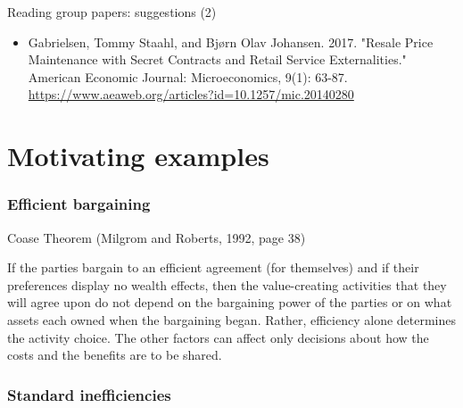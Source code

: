 \documentclass[11pt,english]{beamer}
\begin{document}
\begin{frame}{Reading group papers: suggestions (2)}
  \begin{itemize}

  \item Gabrielsen, Tommy Staahl, and Bjørn Olav Johansen. 2017. "Resale Price Maintenance with Secret Contracts and Retail Service Externalities." American Economic Journal: Microeconomics, 9(1): 63-87. \url{https://www.aeaweb.org/articles?id=10.1257/mic.20140280}  
    
  \end{itemize}
\end{frame}

\part[lecture 1]{Motivating examples}

\section{Efficient bargaining}

\begin{frame}{Coase Theorem (Milgrom and Roberts,
    1992, page 38)}

If the parties bargain to an efficient agreement
(for themselves) and if their preferences display
no wealth effects, then the value-creating activities
that they will agree upon do not depend on the
bargaining power of the parties or on what assets
each owned when the bargaining began. Rather,
efficiency alone determines the activity choice.
The other factors can affect only decisions about
how the costs and the benefits are to be shared.
\end{frame}

\section{Standard inefficiencies}
\end{document}
